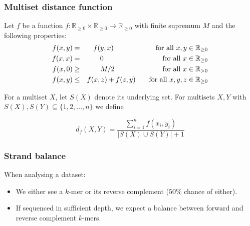 \documentclass[slidestop]{beamer}
\begin{document}
\begin{frame}
  \frametitle{Multiset distance function}

  Let $f$ be a function $f : \mathbb{R}_{\ge 0} \times \mathbb{R}_{\ge 0} 
                               \to \mathbb{R}_{\ge 0}$
  with finite supremum $M$ and the following properties:
  \begin{eqnarray*}
    f(x, y) &=& f(y, x) \hspace*{2cm}\mathrm{\ for\ all\ } x, y \in
      \mathbb{R}_{\ge 0}\\
    f(x, x) &=& 0 \hspace*{2.85cm}\mathrm{\ for\ all\ } x \in \mathbb{R}_{\ge
      0}\\
    f(x, 0) &\ge& {M}/2 \hspace*{2.3cm}\mathrm{\ for\ all\ } x \in
      \mathbb{R}_{> 0}\\
    f(x, y) &\le& f(x, z) + f(z, y) \hspace*{0.56cm}\mathrm{\ for\ all\ } x, y,
      z \in \mathbb{R}_{\ge 0}
  \end{eqnarray*}
  \smallskip
  \pause

  For a multiset $X$, let $S(X)$ denote its underlying set. For multisets $X,
  Y$ with $S(X),S(Y) \subseteq \{1, 2, \ldots, n\}$ we define 
  \smallskip

  \begin{displaymath}
    d_f(X, Y) = \frac{\sum_{i = 1}^n f(x_i, y_i)}{|S(X) \cup S(Y)| + 1}
  \end{displaymath}
  \bigskip
\end{frame}

\begin{frame}
  \frametitle{Strand balance}

  When analysing a dataset:
  \begin{itemize}
    \item We either see a $k$-mer or its reverse complement ($50\%$ chance of
      either).
    \item If sequenced in sufficient depth, we expect a balance between forward
      and reverse complement $k$-mers.
  \end{itemize}
\end{frame}
\end{document}

